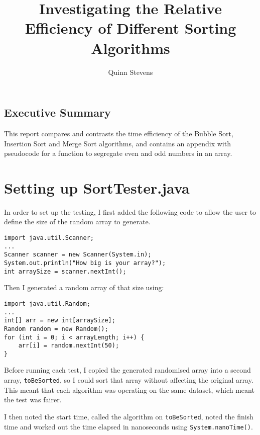 \documentclass{report}
\author{Quinn Stevens}
\title{Investigating the Relative Efficiency of Different Sorting Algorithms}
\begin{document}
\maketitle

\section*{Executive Summary}
This report compares and contrasts the time efficiency of the Bubble Sort, Insertion Sort and Merge Sort algorithms, and contains an appendix with pseudocode for a function to segregate even and odd numbers in an array.

\tableofcontents

\chapter{Setting up Sort\textunderscore Tester.java}
In order to set up the testing, I first added the following code to allow the user to define the size of the random array to generate.

\begin{listing}[ht]
\begin{verbatim}
import java.util.Scanner;
...
Scanner scanner = new Scanner(System.in);
System.out.println("How big is your array?");
int arraySize = scanner.nextInt();
\end{verbatim}
\caption{Setting up Sort\textunderscore Tester.java}
\label{lst:setting up sort tester}
\end{listing}

Then I generated a random array of that size using:

\begin{listing}[ht]
\begin{verbatim}
import java.util.Random;
...
int[] arr = new int[arraySize];
Random random = new Random();
for (int i = 0; i < arrayLength; i++) {
    arr[i] = random.nextInt(50);
}
\end{verbatim}
\caption{Generating the Randomised Array}
\label{lst: generating array}
\end{listing}

Before running each test, I copied the generated randomised array into a second array, \texttt{toBeSorted}, so I could sort that array without affecting the original array. This meant that each algorithm was operating on the same dataset, which meant the test was fairer.

I then noted the start time, called the algorithm on \texttt{toBeSorted}, noted the finish time and worked out the time elapsed in nanoseconds using \texttt{System.nanoTime()}.
\end{document}
